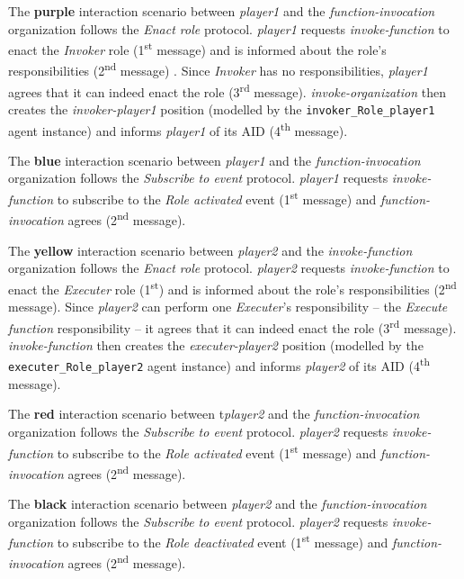 The \textbf{purple} interaction scenario between \textit{player1} and the \textit{function-invocation} organization follows the \textit{Enact role} protocol.
\textit{player1} requests \textit{invoke-function} to enact the \textit{Invoker} role (1\textsuperscript{st} message) and is informed about the role's responsibilities (2\textsuperscript{nd} message) .
Since \textit{Invoker} has no responsibilities, \textit{player1} agrees that it can indeed enact the role (3\textsuperscript{rd} message).
\textit{invoke-organization} then creates the \textit{invoker-player1} position (modelled by the \texttt{invoker\_Role\_player1} agent instance) and informs \textit{player1} of its AID (4\textsuperscript{th} message).

The \textbf{blue} interaction scenario between \textit{player1} and the \textit{function-invocation} organization follows the \textit{Subscribe to event} protocol.
\textit{player1} requests \textit{invoke-function} to subscribe to the \textit{Role activated} event (1\textsuperscript{st} message) and \textit{function-invocation} agrees (2\textsuperscript{nd} message).

The \textbf{yellow} interaction scenario between \textit{player2} and the \textit{invoke-function} organization follows the \textit{Enact role} protocol.
\textit{player2} requests \textit{invoke-function} to enact the \textit{Executer} role (1\textsuperscript{st}) and is informed about the role's responsibilities (2\textsuperscript{nd} message).
Since \textit{player2} can perform one \textit{Executer}'s responsibility -- the \textit{Execute function} responsibility -- it agrees that it can indeed enact the role (3\textsuperscript{rd} message).
\textit{invoke-function} then creates the \textit{executer-player2} position (modelled by the \texttt{executer\_Role\_player2} agent instance) and informs \textit{player2} of its AID (4\textsuperscript{th} message).

The \textbf{red} interaction scenario between t\textit{player2} and the \textit{function-invocation} organization follows the \textit{Subscribe to event} protocol.
\textit{player2} requests \textit{invoke-function} to subscribe to the \textit{Role activated} event (1\textsuperscript{st} message) and \textit{function-invocation} agrees (2\textsuperscript{nd} message).

The \textbf{black} interaction scenario between \textit{player2} and the \textit{function-invocation} organization follows the \textit{Subscribe to event} protocol.
\textit{player2} requests \textit{invoke-function} to subscribe to the \textit{Role deactivated} event (1\textsuperscript{st} message) and \textit{function-invocation} agrees (2\textsuperscript{nd} message).

